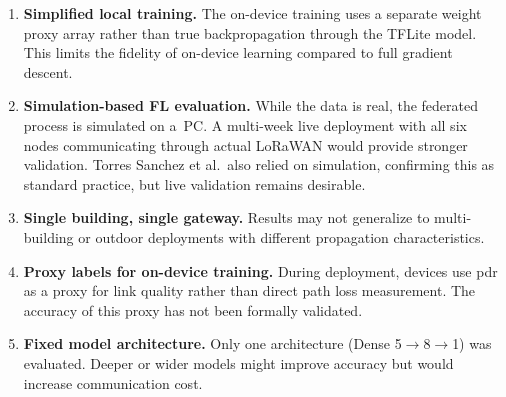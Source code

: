 \begin{enumerate}
  \item \textbf{Simplified local training.} The on-device training uses a separate
    weight proxy array rather than true backpropagation through the TFLite model.
    This limits the fidelity of on-device learning compared to full gradient descent.

  \item \textbf{Simulation-based FL evaluation.} While the data is real, the federated
    process is simulated on a~PC. A multi-week live deployment with all six nodes
    communicating through actual LoRaWAN would provide stronger validation.
    Torres Sanchez et al.\ also relied on simulation, confirming this as standard
    practice, but live validation remains desirable.

  \item \textbf{Single building, single gateway.} Results may not generalize to
    multi-building or outdoor deployments with different propagation characteristics.

  \item \textbf{Proxy labels for on-device training.} During deployment, devices use
    \gls{pdr} as a proxy for link quality rather than direct path loss measurement.
    The accuracy of this proxy has not been formally validated.

  \item \textbf{Fixed model architecture.} Only one architecture (Dense 5$\to$8$\to$1)
    was evaluated. Deeper or wider models might improve accuracy but would increase
    communication cost.
\end{enumerate}
